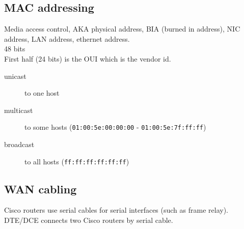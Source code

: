 \subsection{MAC addressing}

Media access control, AKA physical address, BIA (burned in address), NIC
address, LAN address, ethernet address.\\

48 bits\\

First half (24 bits) is the OUI which is the vendor id.

\begin {description}

\item[unicast]
to one host

\item[multicast]
to some hosts (\texttt{01:00:5e:00:00:00} - \texttt{01:00:5e:7f:ff:ff})

\item[broadcast]
to all hosts (\texttt{ff:ff:ff:ff:ff:ff})

\end{description}

\subsection{WAN cabling}

Cisco routers use serial cables for serial interfaces (such as frame relay).\\

DTE/DCE connects two Cisco routers by serial cable.

